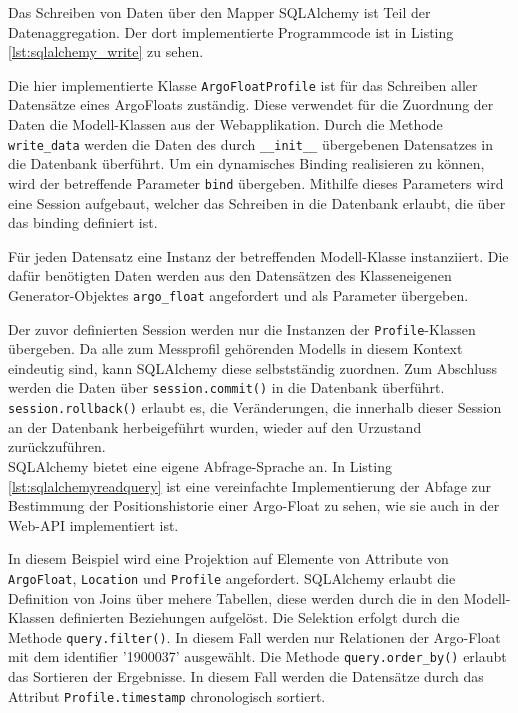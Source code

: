 Das Schreiben von Daten über den Mapper SQLAlchemy ist Teil der Datenaggregation. Der dort implementierte Programmcode ist in Listing \ref{lst:sqlalchemy_write} zu sehen.




Die hier implementierte Klasse \texttt{ArgoFloatProfile} ist für das Schreiben aller Datensätze eines ArgoFloats zuständig. Diese verwendet für die Zuordnung der Daten die Modell-Klassen aus der Webapplikation. Durch die Methode \texttt{write\_data} werden die Daten des durch \texttt{\_\_init\_\_} übergebenen Datensatzes in die Datenbank überführt.
Um ein dynamisches Binding realisieren zu können, wird der betreffende Parameter \texttt{bind} übergeben. Mithilfe dieses Parameters wird eine Session aufgebaut, welcher das Schreiben in die Datenbank erlaubt, die über das binding definiert ist.

Für jeden Datensatz eine Instanz der betreffenden Modell-Klasse instanziiert. Die dafür benötigten Daten werden aus den Datensätzen des Klasseneigenen Generator-Objektes \texttt{argo\_float} angefordert und als Parameter übergeben.

Der zuvor definierten Session werden nur die Instanzen der \texttt{Profile}-Klassen übergeben. Da alle zum Messprofil gehörenden Modells in diesem Kontext eindeutig sind, kann SQLAlchemy diese selbstständig zuordnen.
Zum Abschluss werden die Daten über \texttt{session.commit()} in die Datenbank überführt.
\texttt{session.rollback()} erlaubt es, die Veränderungen, die innerhalb dieser Session an der Datenbank herbeigeführt wurden, wieder auf den Urzustand zurückzuführen.  \\

SQLAlchemy bietet eine eigene Abfrage-Sprache an. In Listing \ref{lst:sqlalchemyreadquery} ist eine vereinfachte Implementierung der Abfage zur Bestimmung der Positionshistorie einer Argo-Float zu sehen, wie sie auch in der Web-API implementiert ist. 


In diesem Beispiel wird eine Projektion auf Elemente von Attribute von \texttt{ArgoFloat}, \texttt{Location} und \texttt{Profile} angefordert. SQLAlchemy erlaubt die Definition von Joins über mehere Tabellen, diese werden durch die in den Modell-Klassen definierten Beziehungen aufgelöst. Die Selektion erfolgt durch die Methode \texttt{query.filter()}. In diesem Fall werden nur Relationen der Argo-Float mit dem identifier '1900037' ausgewählt. Die Methode \texttt{query.order\_by()} erlaubt das Sortieren der Ergebnisse. In diesem Fall werden die Datensätze durch das Attribut \texttt{Profile.timestamp} chronologisch sortiert.
\\

